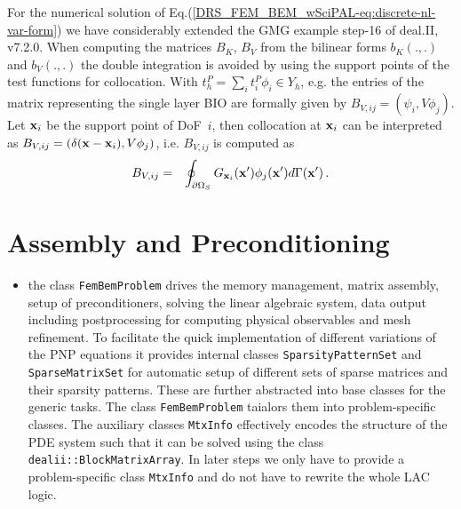 \documentclass[runningheads]{lncse}
\begin{document}
For the numerical solution of Eq.(\ref{DRS_FEM_BEM_wSciPAL-eq:discrete-nl-var-form}) we have considerably extended the GMG example {\sf step-16} of deal.II, v7.2.0. 
%
%
When computing the matrices $B_K$, $B_V$ from the bilinear forms $b_K(.,.)$ and $b_V(.,.)$ the double integration is avoided by using the support points of the test functions for collocation.
%
With $t^P_h = \sum_i t^P_i \phi_i\in Y_h$, e.g. the entries of the matrix representing the single layer BIO are formally given by
$
B_{V,ij} = (\psi_i , V \phi_j ).
$ 
Let ${\bf x}_i$ be the support point of DoF~$i$, then collocation at ${\bf x}_i$ can be interpreted as 
$
B_{V,ij} = (\delta ({\bf x} - {\bf x}_i) , V \phi_j )
$,
i.e. $B_{V,ij}$ is %
 computed as 
\begin{eqnarray}
B_{V,ij} & = & \oint_{\partial \Omega_S}
 G_{{\bf x}_i}({\bf x}') 
     \phi_j({\bf x}')
 d\Gamma ({\bf x}')  %
%
\,.
\end{eqnarray}
%
\section{Assembly and Preconditioning}
%

\begin{itemize}
\item the class \lstinline|FemBemProblem| drives the memory management, matrix assembly, setup of preconditioners, solving the linear algebraic system, data output including postprocessing for computing physical observables and mesh refinement.
%
To facilitate the quick implementation of different variations of the PNP equations it provides internal classes \lstinline|SparsityPatternSet| and \lstinline|SparseMatrixSet| for automatic setup of different sets of sparse matrices and their sparsity patterns. 
%
These are further abstracted into base classes for the generic tasks. The class \lstinline|FemBemProblem| taialors them into problem-specific classes. The auxiliary classes \lstinline|MtxInfo| effectively encodes the structure of the PDE system such that it can be solved using the class \lstinline|dealii::BlockMatrixArray|. In later steps we only have to provide a problem-specific class \lstinline|MtxInfo| and do not have to rewrite the whole LAC logic.
\end{itemize}
\end{document}
